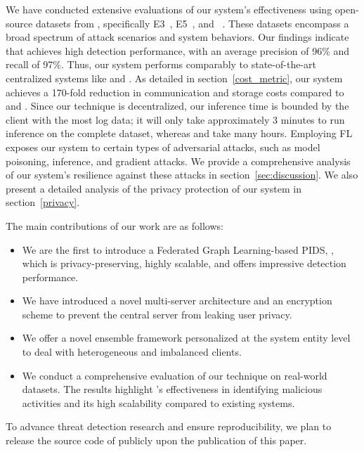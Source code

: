 We have conducted extensive evaluations of our system's effectiveness using open-source datasets from \darpa, specifically E3~\cite{darpae3}, E5~\cite{darpae5}, and \optc~\cite{anjum2021analyzing}. These datasets encompass a broad spectrum of attack scenarios and system behaviors. Our findings indicate that \Sys achieves high detection performance, with an average precision of 96\% and recall of 97\%. Thus, our system performs comparably to state-of-the-art centralized systems like \flash and \kairos. As detailed in section~\ref{cost_metric}, our system achieves a 170-fold reduction in communication and storage costs compared to \flash and \kairos. Since our technique is decentralized, our inference time is bounded by the client with the most log data; it will only take approximately 3 minutes to run inference on the complete \optc dataset, whereas \flash and \kairos take many hours. Employing FL exposes our system to certain types of adversarial attacks, such as model poisoning, inference, and gradient attacks. We provide a comprehensive analysis of our system's resilience against these attacks in section~\ref{sec:discussion}. We also present a detailed analysis of the privacy protection of our system in section~\ref{privacy}.

The main contributions of our work are as follows:

\begin{itemize}[topsep=.1ex,itemsep=-.1ex,leftmargin=*]
    \item We are the first to introduce a Federated Graph Learning-based PIDS, \Sys, which is privacy-preserving, highly scalable, and offers impressive detection performance.
    \item We have introduced a novel multi-server architecture and an encryption scheme to prevent the central server from leaking user privacy.
    \item We offer a novel \gnnshort ensemble framework personalized at the system entity level to deal with heterogeneous and imbalanced clients.
    \item We conduct a comprehensive evaluation of our technique on real-world datasets. The results highlight \Sys's effectiveness in identifying malicious activities and its high scalability compared to existing systems.
\end{itemize}

 To advance threat detection research and ensure reproducibility, we plan to release the source code of \Sys publicly upon the publication of this paper.